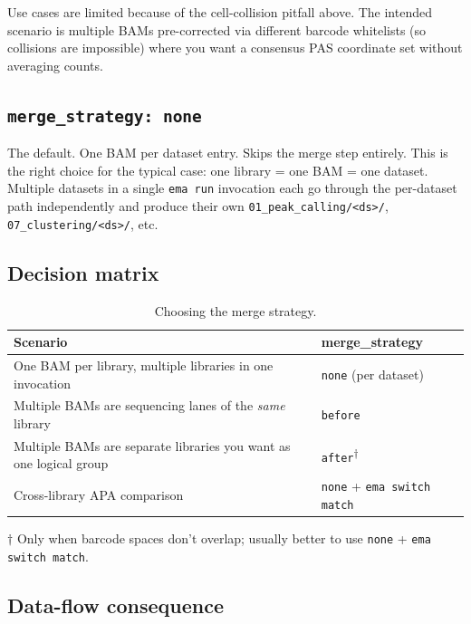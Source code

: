 \documentclass[11pt,a4paper]{article}
\begin{document}
Use cases are limited because of the cell-collision pitfall above. The
intended scenario is multiple BAMs pre-corrected via different barcode
whitelists (so collisions are impossible) where you want a consensus PAS
coordinate set without averaging counts.

\subsection{\texttt{merge\_strategy: none}}

The default. One BAM per dataset entry. Skips the merge step entirely.
This is the right choice for the typical case: one library = one BAM = one
dataset. Multiple datasets in a single \texttt{ema run} invocation each go
through the per-dataset path independently and produce their own
\texttt{01\_peak\_calling/<ds>/}, \texttt{07\_clustering/<ds>/}, etc.

\subsection{Decision matrix}

\begin{table}[htbp]
\centering
\small
\begin{tabularx}{\textwidth}{Xl}
\toprule
\textbf{Scenario} & \textbf{merge\_strategy} \\
\midrule
One BAM per library, multiple libraries in one invocation & \texttt{none} (per dataset) \\
Multiple BAMs are sequencing lanes of the \emph{same} library & \texttt{before} \\
Multiple BAMs are separate libraries you want as one logical group & \texttt{after}\textsuperscript{$\dagger$} \\
Cross-library APA comparison & \texttt{none} + \texttt{ema switch match} \\
\bottomrule
\end{tabularx}
\vspace{0.4em}

{\footnotesize $\dagger$ Only when barcode spaces don't overlap; usually better
to use \texttt{none} + \texttt{ema switch match}.}
\caption{Choosing the merge strategy.}
\label{tab:merge_decision}
\end{table}

\subsection{Data-flow consequence}
\end{document}

